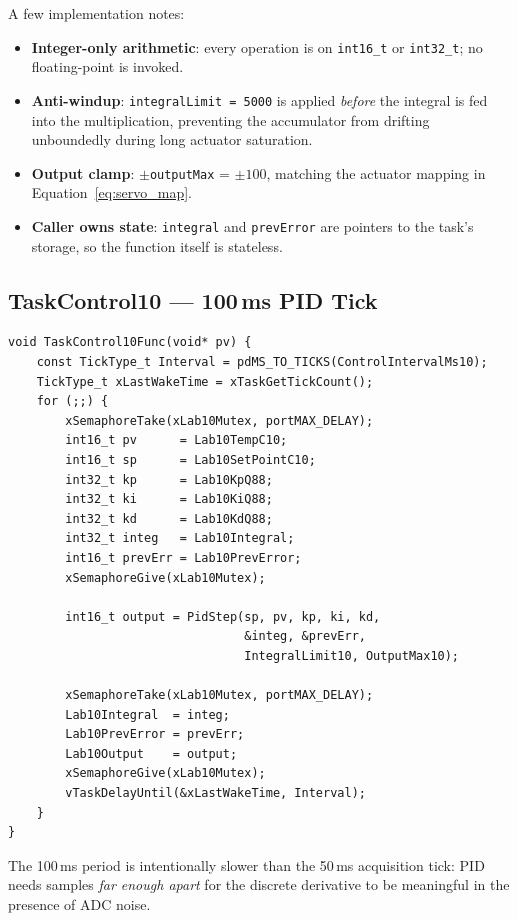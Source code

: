 \documentclass[12pt]{article}
\begin{document}
A few implementation notes:
\begin{itemize}
  \item \textbf{Integer-only arithmetic}: every operation is on \texttt{int16\_t} or \texttt{int32\_t}; no floating-point is invoked.
  \item \textbf{Anti-windup}: \texttt{integralLimit = 5000} is applied \emph{before} the integral is fed into the multiplication, preventing the accumulator from drifting unboundedly during long actuator saturation.
  \item \textbf{Output clamp}: $\pm$\texttt{outputMax} = $\pm 100$, matching the actuator mapping in Equation~\ref{eq:servo_map}.
  \item \textbf{Caller owns state}: \texttt{integral} and \texttt{prevError} are pointers to the task's storage, so the function itself is stateless.
\end{itemize}

\subsection{TaskControl10 --- 100\,ms PID Tick}

\begin{lstlisting}[caption={TaskControl10 --- mutex-protected PID step}]
void TaskControl10Func(void* pv) {
    const TickType_t Interval = pdMS_TO_TICKS(ControlIntervalMs10);
    TickType_t xLastWakeTime = xTaskGetTickCount();
    for (;;) {
        xSemaphoreTake(xLab10Mutex, portMAX_DELAY);
        int16_t pv      = Lab10TempC10;
        int16_t sp      = Lab10SetPointC10;
        int32_t kp      = Lab10KpQ88;
        int32_t ki      = Lab10KiQ88;
        int32_t kd      = Lab10KdQ88;
        int32_t integ   = Lab10Integral;
        int16_t prevErr = Lab10PrevError;
        xSemaphoreGive(xLab10Mutex);

        int16_t output = PidStep(sp, pv, kp, ki, kd,
                                 &integ, &prevErr,
                                 IntegralLimit10, OutputMax10);

        xSemaphoreTake(xLab10Mutex, portMAX_DELAY);
        Lab10Integral  = integ;
        Lab10PrevError = prevErr;
        Lab10Output    = output;
        xSemaphoreGive(xLab10Mutex);
        vTaskDelayUntil(&xLastWakeTime, Interval);
    }
}
\end{lstlisting}

The 100\,ms period is intentionally slower than the 50\,ms acquisition tick: PID needs samples \emph{far enough apart} for the discrete derivative to be meaningful in the presence of ADC noise.
\end{document}
